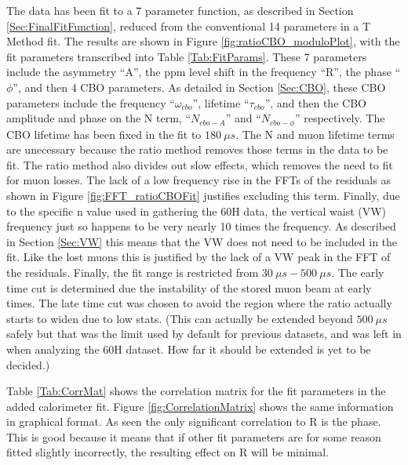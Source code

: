 	The data has been fit to a 7 parameter function, as described in Section \ref{Sec:FinalFitFunction}, reduced from the conventional 14 parameters in a T Method fit. The results are shown in Figure \ref{fig:ratioCBO_moduloPlot}, with the fit parameters transcribed into Table \ref{Tab:FitParams}. These 7 parameters include the asymmetry ``A'', the ppm level shift in the \gmtwo frequency ``R'', the \gmtwo phase ``$\phi$'', and then 4 CBO parameters. As detailed in Section \ref{Sec:CBO}, these CBO parameters include the frequency ``$\omega_{cbo}$'', lifetime ``$\tau_{cbo}$'', and then the CBO amplitude and phase on the N term, ``$N_{cbo-A}$'' and ``$N_{cbo-\phi}$'' respectively. The CBO lifetime has been fixed in the fit to $\SI{180}{\mu s}$. The N and muon lifetime terms are unecessary because the ratio method removes those terms in the data to be fit. The ratio method also divides out slow effects, which removes the need to fit for muon losses. The lack of a low frequency rise in the FFTs of the residuals as shown in Figure \ref{fig:FFT_ratioCBOFit} justifies excluding this term. Finally, due to the specific n value used in gathering the 60H data, the vertical waist (VW) frequency just so happens to be very nearly 10 times the \gmtwo frequency. As described in Section \ref{Sec:VW} this means that the VW does not need to be included in the fit. Like the lost muons this is justified by the lack of a VW peak in the FFT of the residuals. Finally, the fit range is restricted from $\SI{30}{\mu s} - \SI{500}{\mu s}$. The early time cut is determined due the instability of the stored muon beam at early times. The late time cut was chosen to avoid the region where the ratio actually starts to widen due to low stats. (This can actually be extended beyond $\SI{500}{\mu s}$ safely but that was the limit used by default for previous datasets, and was left in when analyzing the 60H dataset. How far it should be extended is yet to be decided.)

	Table \ref{Tab:CorrMat} shows the correlation matrix for the fit parameters in the added calorimeter fit. Figure \ref{fig:CorrelationMatrix} shows the same information in graphical format. As seen the only significant correlation to R is the \gmtwo phase. This is good because it means that if other fit parameters are for some reason fitted slightly incorrectly, the resulting effect on R will be minimal.

